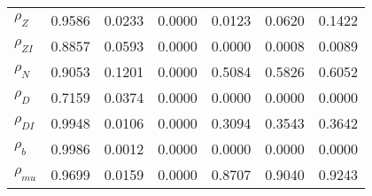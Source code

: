 \begin{center}
\begin{longtable}{lcccccc}
$ {\rho_Z}             $	 & 	          0.9586	 & 	          0.0233	 & 	          0.0000	 & 	          0.0123	 & 	          0.0620	 & 	          0.1422 \\ 
$ {\rho_{ZI}}          $	 & 	          0.8857	 & 	          0.0593	 & 	          0.0000	 & 	          0.0000	 & 	          0.0008	 & 	          0.0089 \\ 
$ {\rho_N}             $	 & 	          0.9053	 & 	          0.1201	 & 	          0.0000	 & 	          0.5084	 & 	          0.5826	 & 	          0.6052 \\ 
$ {\rho_D}             $	 & 	          0.7159	 & 	          0.0374	 & 	          0.0000	 & 	          0.0000	 & 	          0.0000	 & 	          0.0000 \\ 
$ {\rho_{DI}}          $	 & 	          0.9948	 & 	          0.0106	 & 	          0.0000	 & 	          0.3094	 & 	          0.3543	 & 	          0.3642 \\ 
$ {\rho_b}             $	 & 	          0.9986	 & 	          0.0012	 & 	          0.0000	 & 	          0.0000	 & 	          0.0000	 & 	          0.0000 \\ 
$ {\rho_{mu}}          $	 & 	          0.9699	 & 	          0.0159	 & 	          0.0000	 & 	          0.8707	 & 	          0.9040	 & 	          0.9243 \\ 
\end{longtable}
 \end{center}
